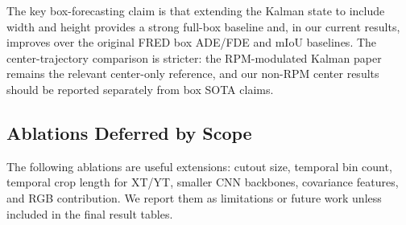 \begin{table}[t]
  \centering
  \caption{Reference results from prior FRED forecasting papers. Original FRED reports full boxes; RPM-Kalman reports centers only. Values are in pixels except mIoU.}
  \label{tab:prior-fred}
\end{table}

The key box-forecasting claim is that extending the Kalman state to include width and height provides a strong full-box baseline and, in our current results, improves over the original FRED box ADE/FDE and mIoU baselines. The center-trajectory comparison is stricter: the RPM-modulated Kalman paper remains the relevant center-only reference, and our non-RPM center results should be reported separately from box SOTA claims.

\subsection{Ablations Deferred by Scope}

The following ablations are useful extensions: cutout size, temporal bin count, temporal crop length for XT/YT, smaller CNN backbones, covariance features, and RGB contribution. We report them as limitations or future work unless included in the final result tables.
